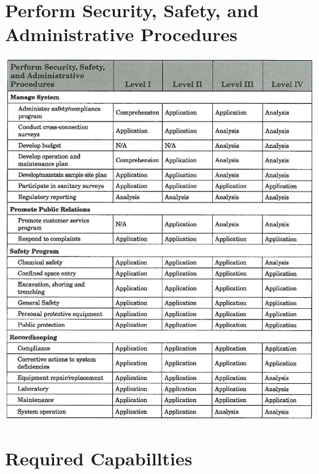 \documentclass[10pt]{article}
\begin{document}
\section{Perform Security, Safety, and Administrative Procedures}
\includegraphics[max width=\textwidth]{2022_11_10_beeca89b60229885003dg-39}

\section{Required Capabillties}
\end{document}
